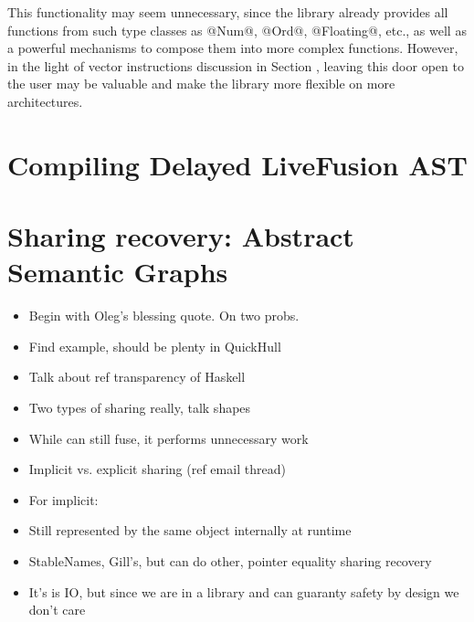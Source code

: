 \documentclass[preamble.tex]{subfiles}
\begin{document}
This functionality may seem unnecessary, since the library already provides all functions from such type classes as @Num@, @Ord@, @Floating@, etc., as well as a powerful mechanisms to compose them into more complex functions. However, in the light of vector instructions discussion in Section , leaving this door open to the user may be valuable and make the library more flexible on more architectures.


\clearpage

\section{Compiling Delayed LiveFusion AST}

\section{Sharing recovery: Abstract Semantic Graphs}

\begin{itemize}
\item Begin with Oleg's blessing quote. On two probs.
\item Find example, should be plenty in QuickHull
\item Talk about ref transparency of Haskell
\item Two types of sharing really, talk shapes
\item While can still fuse, it performs unnecessary work
\item Implicit vs. explicit sharing (ref email thread)
\item For implicit:
\item Still represented by the same object internally at runtime
\item StableNames, Gill's, but can do other, pointer equality sharing recovery
\item It's is IO, but since we are in a library and can guaranty safety by design we don't care
\end{itemize}


\IfNotCompilingAll{}
\end{document}
